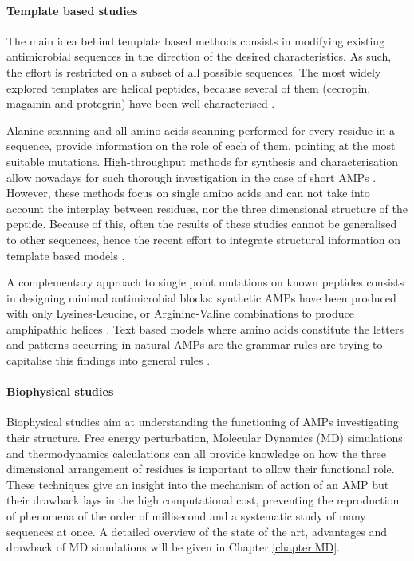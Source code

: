 \paragraph{Template based studies}
The main idea behind template based methods consists in modifying existing antimicrobial sequences in the direction of the desired characteristics.
As such, the effort is restricted on a subset of all possible sequences.
%
The most widely explored templates are helical peptides, because several of them (cecropin, magainin and protegrin) have been well characterised \citep{Wang2015}.

Alanine scanning \citep{Migon2018} and all amino acids scanning \citep{Hilpert2005} performed for every residue in a sequence, provide information on the role of each of them, pointing at the most suitable mutations. High-throughput methods for synthesis and characterisation allow nowadays for such thorough investigation in the case of short AMPs \citep{Hilpert2005}.
%
%
However, these methods focus on single amino acids and can not take into account the interplay between residues, nor the three dimensional structure of the peptide. Because of this, often the results of these studies cannot be generalised to other sequences, hence the recent effort to integrate structural information on template based models \citep{Liu2018,Jiang2011}.

A complementary approach to single point mutations on known peptides consists in designing minimal antimicrobial blocks: synthetic AMPs have been produced with only Lysines-Leucine, or Arginine-Valine combinations to produce amphipathic helices \citep{Deslouches2005}.
%
Text based models where amino acids constitute the letters and patterns occurring in natural AMPs are the grammar rules are trying to capitalise this findings into general rules \citep{Loose2006,Cipcigan2018,Spanig2019}.


\paragraph{Biophysical studies}
Biophysical studies aim at understanding the functioning of AMPs investigating their structure. Free energy perturbation, Molecular Dynamics (MD) simulations and thermodynamics calculations can all provide knowledge on how the three dimensional arrangement of residues is important to allow their functional role.
%
These techniques give an insight into the mechanism of action of an AMP but their drawback lays in the high computational cost, preventing the reproduction of phenomena of the order of millisecond and a systematic study of many sequences at once. A detailed overview of the state of the art, advantages and drawback of MD simulations will be given in Chapter \ref{chapter:MD}.

